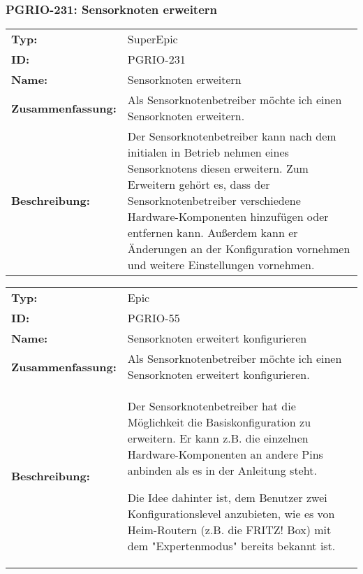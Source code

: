	\subsubsection{PGRIO-231: Sensorknoten erweitern} 
\begin{flushleft} 
\begin{tabular}{@{}lp{100mm}} 
\textbf{Typ:} & SuperEpic \\ 
\textbf{ID:} & PGRIO-231 \\ 
\textbf{Name:} & Sensorknoten erweitern \\ 
\textbf{Zusammenfassung:} & Als Sensorknotenbetreiber möchte ich einen Sensorknoten erweitern. \\ 
\textbf{Beschreibung:} & Der Sensorknotenbetreiber kann nach dem initialen in Betrieb nehmen eines Sensorknotens diesen erweitern. Zum Erweitern gehört es, dass der Sensorknotenbetreiber verschiedene Hardware-Komponenten hinzufügen oder entfernen kann.  Außerdem kann er Änderungen an der Konfiguration vornehmen und weitere Einstellungen vornehmen. \\ 
\end{tabular} 
\end{flushleft} 

		\begin{flushleft} 
\begin{tabular}{@{}lp{100mm}} 
\textbf{Typ:} & Epic \\ 
\textbf{ID:} & PGRIO-55 \\ 
\textbf{Name:} & Sensorknoten erweitert konfigurieren \\ 
\textbf{Zusammenfassung:} & Als Sensorknotenbetreiber möchte ich einen Sensorknoten erweitert konfigurieren. \\ 
\textbf{Beschreibung:} & Der Sensorknotenbetreiber hat die Möglichkeit die Basiskonfiguration zu erweitern. Er kann z.B. die einzelnen Hardware-Komponenten an andere Pins anbinden als es in der Anleitung steht.

Die Idee dahinter ist, dem Benutzer zwei Konfigurationslevel anzubieten, wie es von Heim-Routern (z.B. die FRITZ! Box) mit dem "Expertenmodus" bereits bekannt ist. \\ 
\end{tabular} 
\end{flushleft} 

